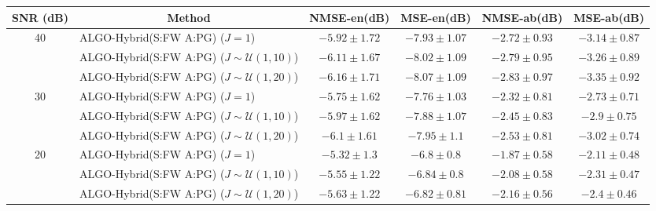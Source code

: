 \begin{table}[h]
\centering
\begin{adjustbox}{max width=\textwidth}
\begin{tabular}{|c|l|c|c|c|c|}
\hline
SNR (dB)            & \multicolumn{1}{c|}{Method}                       & NMSE-en(dB)         & MSE-en(dB)          & NMSE-ab(dB)         & MSE-ab(dB)          \tabularnewline \hline
\multirow{3}{*}{40} & ALGO-Hybrid(S:FW A:PG) ($J=1$)                    & $-5.92    \pm 1.72$ & $-7.93    \pm 1.07$ & $-2.72    \pm 0.93$ & $-3.14    \pm 0.87$ \tabularnewline
                    & ALGO-Hybrid(S:FW A:PG) ($J\sim\mathcal{U}(1,10)$) & $-6.11    \pm 1.67$ & $-8.02    \pm 1.09$ & $-2.79    \pm 0.95$ & $-3.26    \pm 0.89$ \tabularnewline
                    & ALGO-Hybrid(S:FW A:PG) ($J\sim\mathcal{U}(1,20)$) & $-6.16    \pm 1.71$ & $-8.07    \pm 1.09$ & $-2.83    \pm 0.97$ & $-3.35    \pm 0.92$ \tabularnewline \hline
\multirow{3}{*}{30} & ALGO-Hybrid(S:FW A:PG) ($J=1$)                    & $-5.75    \pm 1.62$ & $-7.76    \pm 1.03$ & $-2.32    \pm 0.81$ & $-2.73    \pm 0.71$ \tabularnewline
                    & ALGO-Hybrid(S:FW A:PG) ($J\sim\mathcal{U}(1,10)$) & $-5.97    \pm 1.62$ & $-7.88    \pm 1.07$ & $-2.45    \pm 0.83$ & $-2.9     \pm 0.75$ \tabularnewline
                    & ALGO-Hybrid(S:FW A:PG) ($J\sim\mathcal{U}(1,20)$) & $-6.1     \pm 1.61$ & $-7.95    \pm 1.1$  & $-2.53    \pm 0.81$ & $-3.02    \pm 0.74$ \tabularnewline \hline
\multirow{3}{*}{20} & ALGO-Hybrid(S:FW A:PG) ($J=1$)                    & $-5.32    \pm 1.3$  & $-6.8     \pm 0.8$  & $-1.87    \pm 0.58$ & $-2.11    \pm 0.48$ \tabularnewline
                    & ALGO-Hybrid(S:FW A:PG) ($J\sim\mathcal{U}(1,10)$) & $-5.55    \pm 1.22$ & $-6.84    \pm 0.8$  & $-2.08    \pm 0.58$ & $-2.31    \pm 0.47$ \tabularnewline
                    & ALGO-Hybrid(S:FW A:PG) ($J\sim\mathcal{U}(1,20)$) & $-5.63    \pm 1.22$ & $-6.82    \pm 0.81$ & $-2.16    \pm 0.56$ & $-2.4     \pm 0.46$ \tabularnewline \hline

\end{tabular}
\end{adjustbox}
\end{table}
